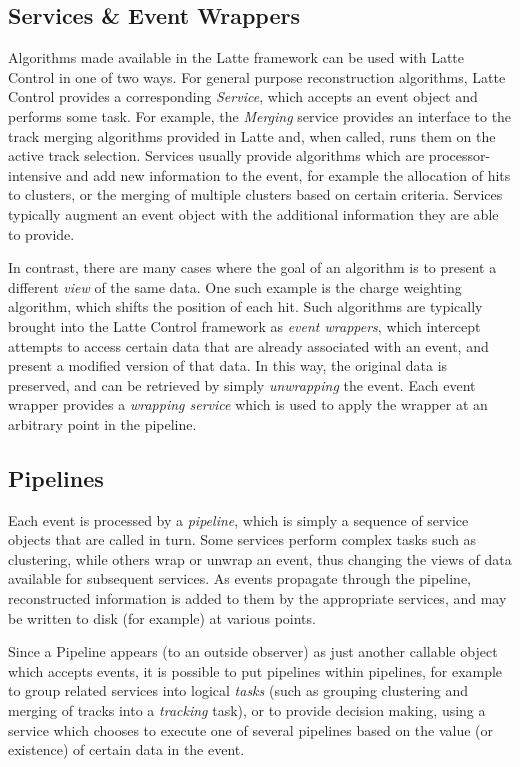 \subsection{Services \& Event Wrappers}
Algorithms made available in the Latte framework can be used with Latte Control in one of two ways. For general purpose reconstruction algorithms, Latte Control provides a corresponding \emph{Service}, which accepts an event object and performs some task. For example, the \emph{Merging} service provides an interface to the track merging algorithms provided in Latte and, when called, runs them on the active track selection. Services usually provide algorithms which are processor-intensive and add new information to the event, for example the allocation of hits to clusters, or the merging of multiple clusters based on certain criteria. Services typically augment an event object with the additional information they are able to provide.

In contrast, there are many cases where the goal of an algorithm is to present a different \emph{view} of the same data. One such example is the charge weighting algorithm, which shifts the position of each hit. Such algorithms are typically brought into the Latte Control framework as \emph{event wrappers}, which intercept attempts to access certain data that are already associated with an event, and present a modified version of that data. In this way, the original data is preserved, and can be retrieved by simply \emph{unwrapping} the event. Each event wrapper provides a \emph{wrapping service} which is used to apply the wrapper at an arbitrary point in the pipeline.

\subsection{Pipelines}
Each event is processed by a \emph{pipeline}, which is simply a sequence of service objects that are called in turn. Some services perform complex tasks such as clustering, while others wrap or unwrap an event, thus changing the views of data available for subsequent services. As events propagate through the pipeline, reconstructed information is added to them by the appropriate services, and may be written to disk (for example) at various points.

Since a Pipeline appears (to an outside observer) as just another callable object which accepts events, it is possible to put pipelines within pipelines, for example to group related services into logical \emph{tasks} (such as grouping clustering and merging of tracks into a \emph{tracking} task), or to provide decision making, using a service which chooses to execute one of several pipelines based on the value (or existence) of certain data in the event.

